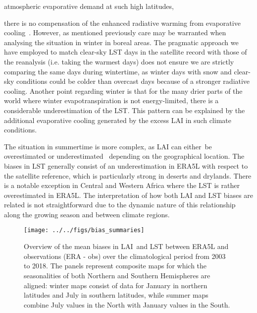 \documentclass[gmd, manuscript]{copernicus}
\begin{document}
atmospheric evaporative demand at such high latitudes,~{there is no
compensation of the enhanced radiative warming from evaporative
cooling~\citep{bright2017local}. However, as mentioned previously 
care may be warranted when analysing the situation in winter in boreal areas. 
The pragmatic approach we have employed to match 
clear-sky LST days in the satellite record with those of the reanalysis 
(i.e. taking the warmest days) does not ensure we are strictly comparing the 
same days during wintertime, as winter days with snow and clear-sky conditions 
could be colder than overcast days because of a stronger radiative cooling. 
Another point regarding winter is that for the many drier parts of the world where
winter evapotranspiration is not energy-limited, there is a considerable
underestimation of the LST. This pattern can be explained by the additional 
evaporative cooling generated by the excess LAI in such climate conditions.

The situation in summertime is more complex, as LAI can either~be overestimated 
or underestimated~ depending on the geographical location. The biases in LST 
generally consist of an underestimation in ERA5L with respect to the satellite 
reference, which is particularly strong in deserts and drylands. There is a 
notable exception in Central and Western Africa where the LST is rather
overestimated in ERA5L. The interpretation of how both LAI and LST
biases are related is not straightforward due to the dynamic nature of
this relationship along the growing season and between climate regions.~

\par\null{}
\begin{figure}[H]
\begin{center}
\texttt{[image: ../../figs/bias\_summaries]}
\caption{{{Overview of the mean biases} in LAI~and LST between ERA5L and
observations (ERA - obs) over the climatological period from 2003 to
2018. The panels represent composite maps for which the seasonalities of
both Northern and Southern Hemispheres are aligned: winter maps consist
of data for January in northern latitudes and July in southern
latitudes, while summer maps combine July values in the North with
January values in the South.
{\label{220254}}%
}}
\end{center}
\end{figure}

\par\null

}
\end{document}
